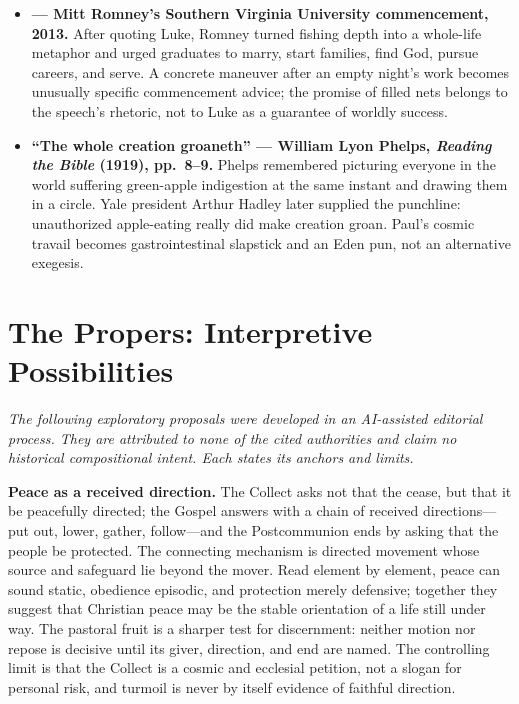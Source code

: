\begin{deepstudy}
{\begin{itemize}[itemsep=0.35em,topsep=0.2em,parsep=0pt]
\item \textbf{ --- Mitt Romney's Southern Virginia University commencement, 2013.} After quoting Luke, Romney turned fishing depth into a whole-life metaphor and urged graduates to marry, start families, find God, pursue careers, and serve. A concrete maneuver after an empty night's work becomes unusually specific commencement advice; the promise of filled nets belongs to the speech's rhetoric, not to Luke as a guarantee of worldly success.

\item \textbf{``The whole creation groaneth'' --- William Lyon Phelps, \emph{Reading the Bible} (1919), pp.~8--9.} Phelps remembered picturing everyone in the world suffering green-apple indigestion at the same instant and drawing them in a circle. Yale president Arthur Hadley later supplied the punchline: unauthorized apple-eating really did make creation groan. Paul's cosmic travail becomes gastrointestinal slapstick and an Eden pun, not an alternative exegesis.
\end{itemize}
}

\sectionguard
\section*{The Propers: Interpretive Possibilities}

\noindent\emph{The following exploratory proposals were developed in an AI-assisted editorial process. They are attributed to none of the cited authorities and claim no historical compositional intent. Each states its anchors and limits.}

\noindent\textbf{Peace as a received direction.\enspace{}}
The Collect asks not that the  cease, but that it be peacefully directed; the Gospel answers with a chain of received directions---put out, lower, gather, follow---and the Postcommunion ends by asking that the people be protected. The connecting mechanism is directed movement whose source and safeguard lie beyond the mover. Read element by element, peace can sound static, obedience episodic, and protection merely defensive; together they suggest that Christian peace may be the stable orientation of a life still under way. The pastoral fruit is a sharper test for discernment: neither motion nor repose is decisive until its giver, direction, and end are named. The controlling limit is that the Collect is a cosmic and ecclesial petition, not a slogan for personal risk, and turmoil is never by itself evidence of faithful direction.


\end{deepstudy}
